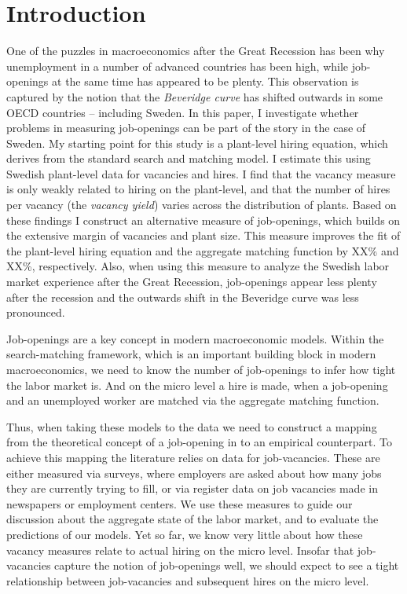 \section{Introduction}

One of the puzzles in macroeconomics after the Great Recession has been why unemployment in a number of advanced countries has been high, while job-openings at the same time has appeared to be plenty. This observation is captured by the notion that the \emph{Beveridge curve} has shifted outwards in some OECD countries -- including Sweden. In this paper, I investigate whether problems in measuring job-openings can be part of the story in the case of Sweden. My starting point for this study is a plant-level hiring equation, which derives from the standard search and matching model. I estimate this using Swedish plant-level data for vacancies and hires. I find that the vacancy measure is only weakly related to hiring on the plant-level, and that the number of hires per vacancy (the \emph{vacancy yield}) varies across the distribution of plants. Based on these findings I construct an alternative measure of job-openings, which builds on the extensive margin of vacancies and plant size. This measure improves the fit of the plant-level hiring equation and the aggregate matching function by XX\% and XX\%, respectively. Also, when using this measure to analyze the Swedish labor market experience after the Great Recession, job-openings appear less plenty after the recession and the outwards shift in the Beveridge curve was less pronounced. 

Job-openings are a key concept in modern macroeconomic models. Within the search-matching framework, which is an important building block in modern macroeconomics, we need to know the number of job-openings to infer how tight the labor market is. And on the micro level a hire is made, when a job-opening and an unemployed worker are matched via the aggregate matching function.

Thus, when taking these models to the data we need to construct a mapping from the theoretical concept of a job-opening in to an empirical counterpart. To achieve this mapping the literature relies on data for job-vacancies. These are either measured via surveys, where employers are asked about how many jobs they are currently trying to fill, or via register data on job vacancies made in newspapers or employment centers. We use these measures to guide our discussion about the aggregate state of the labor market, and to evaluate the predictions of our models. Yet so far, we know very little about how these vacancy measures relate to actual hiring on the micro level. Insofar that job-vacancies capture the notion of job-openings well, we should expect to see a tight relationship between job-vacancies and subsequent hires on the micro level. 

